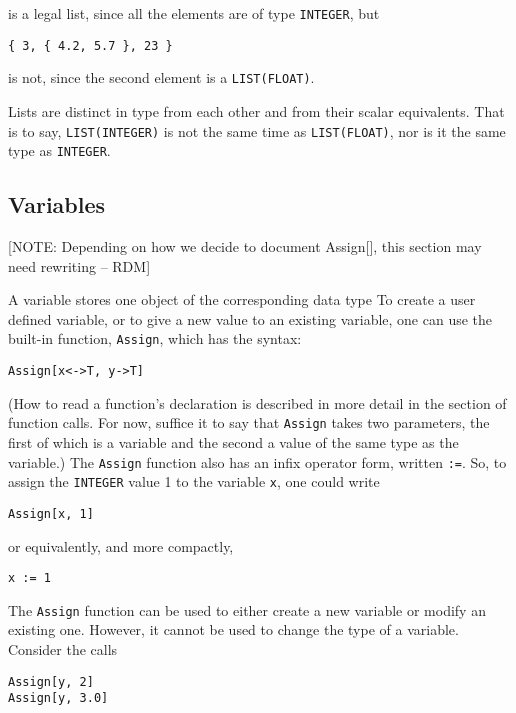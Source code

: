 \noindent is a legal list, since all the elements are of type 
{\tt INTEGER}, but

\begin{verbatim}
{ 3, { 4.2, 5.7 }, 23 }
\end{verbatim}

\noindent is not, since the second element is a {\tt LIST(FLOAT)}.

Lists are distinct in type from each other and from their scalar
equivalents.  That is to say, {\tt LIST(INTEGER)} is not the same time
as {\tt LIST(FLOAT)}, nor is it the same type as {\tt INTEGER}.

\subsection{Variables}

[NOTE:  Depending on how we decide to document Assign[], this section
may need rewriting -- RDM]

A variable stores one object of the corresponding data type To create
a user defined variable, or to give a new value to an existing
variable, one can use the built-in function, \verb+Assign+, which has
the syntax:
\begin{verbatim}
Assign[x<->T, y->T]
\end{verbatim}

\noindent (How to read a function's declaration is described in more
detail in the section of function calls.  For now, suffice it to say that
{\tt Assign} takes two parameters, the first of which is a variable and
the second a value of the same type as the variable.)  The {\tt Assign}
function also has an infix operator form, written {\tt :=}.  So, to assign
the {\tt INTEGER} value 1 to the variable {\tt x}, one could write

\begin{verbatim}
Assign[x, 1]
\end{verbatim}

\noindent or equivalently, and more compactly,

\begin{verbatim}
x := 1
\end{verbatim}

The {\tt Assign} function can be used to either create a new variable or
modify an existing one.  However, it cannot be used to change the type
of a variable.  Consider the calls

\begin{verbatim}
Assign[y, 2]
Assign[y, 3.0]
\end{verbatim}

